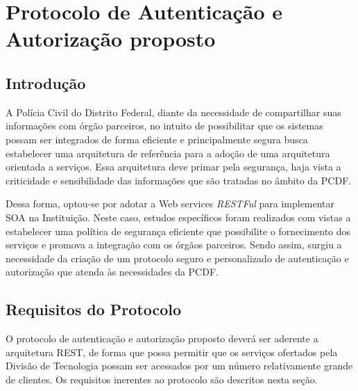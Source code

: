 \chapter{Protocolo de Autenticação e Autorização proposto}\label{cap:Protocolo}
\section{Introdução}

A Polícia Civil do Distrito Federal, diante da necessidade de compartilhar suas informações com órgão parceiros, no intuito de possibilitar que os sistemas possam ser integrados de forma eficiente e principalmente segura busca estabelecer uma arquitetura de referência para a adoção de uma arquitetura orientada a serviços. Essa arquitetura deve primar pela segurança, haja vista a criticidade e sensibilidade das informações que são tratadas no âmbito da PCDF.

Dessa forma, optou-se por adotar a Web services \emph{RESTFul} para implementar SOA na Instituição. Neste caso, estudos específicos foram realizados com vistas a estabelecer uma política de segurança eficiente que possibilite o fornecimento dos serviços e promova a integração com os órgãos parceiros. Sendo assim, surgiu a necessidade da criação de um protocolo seguro e personalizado de autenticação e autorização que atenda às necessidades da PCDF.

\section{Requisitos do Protocolo}\label{sec:reqprotocolo}

O protocolo de autenticação e autorização proposto deverá ser aderente a arquitetura REST, de forma que possa permitir que os serviços ofertados pela Divisão de Tecnologia possam ser acessados por um número relativamente grande de clientes. Os requisitos inerentes ao protocolo são descritos nesta seção.

